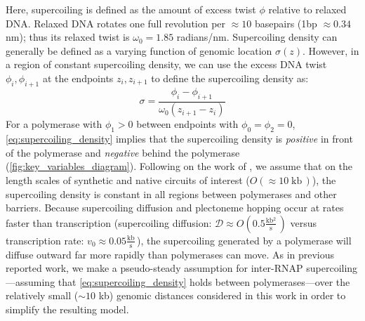 \documentclass[11pt]{article} %
\newcommand{\units}[2]{\frac{\text{#1}}{\text{#2}}\,}
\newcommand{\unit}[1]{\; \text{#1}\,}
\begin{document}
Here, supercoiling is defined as the amount of excess twist \(\phi\) relative to relaxed DNA. Relaxed DNA rotates  one full revolution per \(\approx10\) basepairs (1bp \(\approx 0.34\) nm); thus its relaxed twist is \(\omega_0 = 1.85\) radians/nm. Supercoiling density can generally be defined as a varying function of genomic location \(\sigma(z)\). However, in a region of constant supercoiling density, we can use the excess DNA twist \(\phi_i, \phi_{i+1}\) at the endpoints \(z_i, z_{i+1}\) to define the supercoiling density as:
\begin{equation}
    \sigma = \frac{\phi_i - \phi_{i+1}}{\omega_0 (z_{i+1} - z_{i})}
\label{eq:supercoiling_density}
\end{equation}
For a polymerase with \(\phi_1 > 0\) between endpoints with \(\phi_0 = \phi_2 = 0\), \cref{eq:supercoiling_density} implies that the supercoiling density is \emph{positive} in front of the polymerase and \emph{negative} behind the polymerase (\cref{fig:key_variables_diagram}). Following on the work of \textcite{sevierPropertiesGeneExpression2018}, we assume that on the length scales of synthetic and native circuits of interest (\(O(\approx10 \unit{kb})\)), the supercoiling density is constant in all regions between polymerases and other barriers. Because supercoiling diffusion and plectoneme hopping \parencite{loenhoutDynamicsDNASupercoils2012} occur at rates faster than transcription (supercoiling diffusion: \(\mathcal{D} \approx O(0.5 \units{kb$^2$}{s})\) versus transcription rate: \(v_0 \approx 0.05 \units{kb}{s}\))\parencite{munizRNAPolymeraseII2021}, the supercoiling generated by a polymerase will diffuse outward far more rapidly than polymerases can move. As in previous reported work, we make a pseudo-steady assumption for inter-RNAP supercoiling---assuming that \cref{eq:supercoiling_density} holds between polymerases---over the relatively small (\(\sim 10\) kb) genomic distances considered in this work in order to simplify the resulting model.
\end{document}
